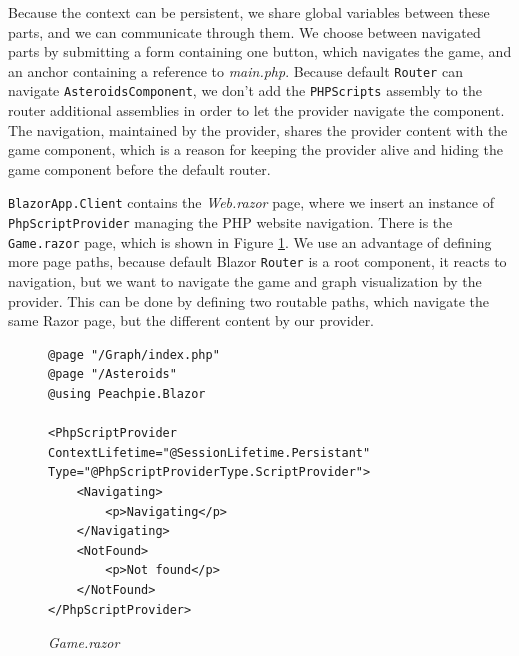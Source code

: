 Because the context can be persistent, we share global variables between these parts, and we can communicate through them.
We choose between navigated parts by submitting a form containing one button, which navigates the game, and an anchor containing a reference to \textit{main.php}.
Because default \texttt{Router} can navigate \texttt{AsteroidsComponent}, we don't add the \texttt{PHPScripts} assembly to the router additional assemblies in order to let the provider navigate the component.
The navigation, maintained by the provider, shares the provider content with the game component, which is a reason for keeping the provider alive and hiding the game component before the default router.
\par
\texttt{BlazorApp.Client} contains the \textit{Web.razor} page, where we insert an instance of \texttt{PhpScriptProvider} managing the PHP website navigation.
There is the \texttt{Game.razor} page, which is shown in Figure \ref{img29:razor}.
We use an advantage of defining more page paths, because default Blazor \texttt{Router} is a root component, it reacts to navigation, but we want to navigate the game and graph visualization by the provider.
This can be done by defining two routable paths, which navigate the same Razor page, but the different content by our provider.
\par
\begin{figure}[!b]
\begin{lstlisting}
@page "/Graph/index.php"
@page "/Asteroids"
@using Peachpie.Blazor

<PhpScriptProvider ContextLifetime="@SessionLifetime.Persistant" 
Type="@PhpScriptProviderType.ScriptProvider">
    <Navigating>
        <p>Navigating</p>
    </Navigating>
    <NotFound>
        <p>Not found</p>
    </NotFound>
</PhpScriptProvider>
\end{lstlisting}
\caption{\textit{Game.razor}}
\label{img29:razor}
\end{figure}
